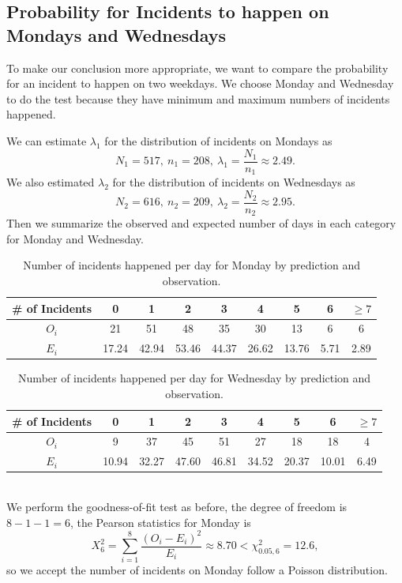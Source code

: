 \documentclass[11pt,a4paper,english]{article}
\begin{document}
\subsection{Probability for Incidents to happen on Mondays and Wednesdays}
To make our conclusion more appropriate, we want to compare the probability for an incident to happen on two weekdays. 
We choose Monday and Wednesday to do the test because they have minimum and maximum numbers of incidents happened.

We can estimate $\lambda_{1}$ for the distribution of incidents on Mondays as 
\begin{equation*}
	N_{1} = 517,\ n_{1} = 208,\ \hat{\lambda_{1}} = \frac{N_{1}}{n_{1}} \approx 2.49.
\end{equation*}
We also estimated $\lambda_{2}$ for the distribution of incidents on Wednesdays as
\begin{equation*}
	N_{2} = 616,\ n_{2} = 209,\ \hat{\lambda_{2}} = \frac{N_{2}}{n_{2}} \approx 2.95.
\end{equation*}
Then we summarize the observed and expected number of days in each category for Monday and Wednesday.
\begin{table}[htbp]
	\centering
	\begin{tabular}{c|cccccccc}
		\hline
		\# of Incidents & 0 & 1 & 2 & 3 & 4 & 5 & 6 & $\geq 7$ \\
		\hline
		$O_{i}$ & 21 & 51 & 48 & 35 & 30 & 13 & 6 & 6\\
		\hline
		$E_{i}$ & 17.24 & 42.94 & 53.46 & 44.37 & 26.62 & 13.76 & 5.71 & 2.89\\
		\hline
	\end{tabular}
	\caption{Number of incidents happened per day for Monday by prediction and observation.}
\end{table}
\begin{table}[htbp]
	\centering
	\begin{tabular}{c|cccccccc}
		\hline
		\# of Incidents & 0 & 1 & 2 & 3 & 4 & 5 & 6 & $\geq 7$ \\	
		\hline
		$O_{i}$ & 9 & 37 & 45 & 51 & 27 & 18 & 18 & 4\\
		\hline
		$E_{i}$ & 10.94 & 32.27 & 47.60 & 46.81 & 34.52 & 20.37 & 10.01 & 6.49\\
		\hline
	\end{tabular}
	\caption{Number of incidents happened per day for Wednesday by prediction and observation.}
\end{table}
\\We perform the goodness-of-fit test as before, the degree of freedom is $8-1-1 = 6$, the Pearson statistics for Monday is 
\begin{equation*}
	X^{2}_{6} = \sum_{i = 1}^{8}\frac{(O_{i}-E_{i})^{2}}{E_{i}} \approx 8.70 < \chi^{2}_{0.05,6} = 12.6,
\end{equation*}
so we accept the number of incidents on Monday follow a Poisson distribution.
\end{document}
